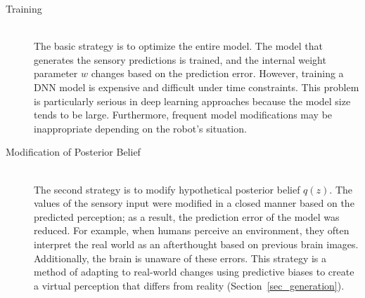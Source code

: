 \begin{description}
\item[Training]\mbox{}\\
The basic strategy is to optimize the entire model. The model that generates the sensory predictions is trained, and the internal weight parameter $w$ changes based on the prediction error. However, training a DNN model is expensive and difficult under time constraints. This problem is particularly serious in deep learning approaches because the model size tends to be large. Furthermore, frequent model modifications may be inappropriate depending on the robot's situation.


\item[Modification of Posterior Belief]\mbox{}\\
The second strategy is to modify hypothetical posterior belief $q(z)$. The values of the sensory input were modified in a closed manner based on the predicted perception; as a result, the prediction error of the model was reduced. For example, when humans perceive an environment, they often interpret the real world as an afterthought based on previous brain images. Additionally, the brain is unaware of these errors. This strategy is a method of adapting to real-world changes using predictive biases to create a virtual perception that differs from reality (Section~\ref{sec_generation}).



\end{description}
